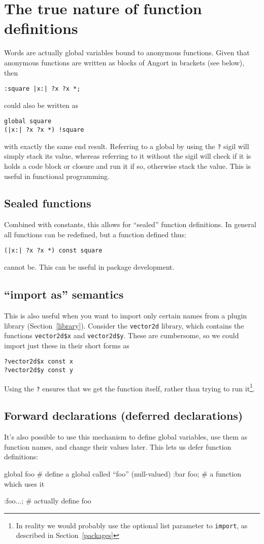 \section{The true nature of function definitions}
\label{globdetails}
Words are actually global variables bound to anonymous functions.
Given that anonymous functions are written as blocks of Angort
in brackets (see below), then
\begin{lstlisting}
:square |x:| ?x ?x *;
\end{lstlisting}
could also be written as
\begin{lstlisting}
global square
(|x:| ?x ?x *) !square
\end{lstlisting}
with exactly the same end result. Referring to a global by using the \texttt{?} sigil
will simply stack its value, whereas referring to it without the sigil
will check if it is holds a code block or closure and run it if so, otherwise
stack the value. This is useful in functional programming.

\subsection{Sealed functions}
Combined with constants, this allows for ``sealed'' function definitions. 
In general all functions can be redefined, but a function defined thus:
\begin{lstlisting}
(|x:| ?x ?x *) const square
\end{lstlisting}
cannot be. This can be useful in package development.

\subsection{``import as'' semantics}
This is also useful when you want to import only certain names from
a plugin library (Section~\ref{library}). Consider the \texttt{vector2d} library, which contains
the functions \texttt{vector2d\$x} and \texttt{vector2d\$y}. These
are cumbersome, so we could import just these in their short forms
as
\begin{lstlisting}
?vector2d$x const x
?vector2d$y const y
\end{lstlisting}
Using the \texttt{?} ensures that we get the function itself, rather
than trying to run it\footnote{In reality we would probably use
the optional list parameter to \texttt{import}, as described in
Section~\ref{packages}}.

\subsection{Forward declarations (deferred declarations)}
It's also possible to use this mechanism to define global variables,
use them as function names, and change their values later. This lets
us defer function definitions:
\begin{v}
global foo      # define a global called ``foo'' (null-valued)
:bar foo;       # a function which uses it

:foo...;        # actually define foo
\end{v}


